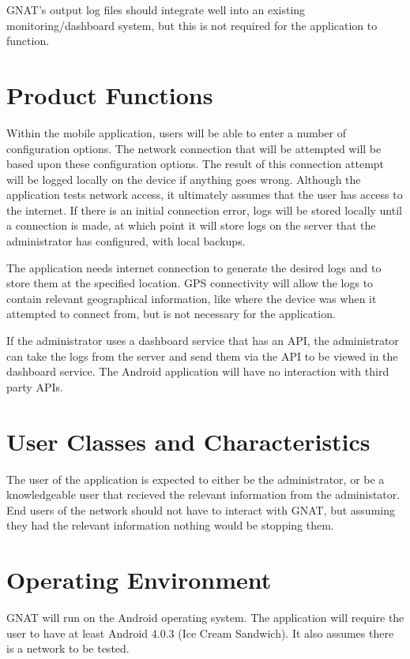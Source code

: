 \documentclass{scrreprt}
\begin{document}
GNAT's output log files should integrate well into an existing monitoring/dashboard system, but this is not required for the application to function.


\section{Product Functions}

Within the mobile application, users will be able to enter a number of configuration options.  The network connection that will be attempted will be based upon these configuration options.  The result of this connection attempt will be logged locally on the device if anything goes wrong. Although the application tests network access, it ultimately assumes that the user has access to the internet.  If there is an initial connection error, logs will be stored locally until a connection is made, at which point it will store logs on the server that the administrator has configured, with local backups.

The application needs internet connection to generate the desired logs and to store them at the specified location. GPS connectivity will allow the logs to contain relevant geographical information, like where the device was when it attempted to connect from, but is not necessary for the application.

If the administrator uses a dashboard service that has an API, the administrator can take the logs from the server and send them via the API to be viewed in the dashboard service. The Android application will have no interaction with third party APIs.

\section{User Classes and Characteristics}
The user of the application is expected to either be the administrator, or be a knowledgeable user that recieved the relevant information from the administator.  End users of the network should not have to interact with GNAT, but assuming they had the relevant information nothing would be stopping them.

\section{Operating Environment}
GNAT will run on the Android operating system.  The application will require the user to have at least Android 4.0.3 (Ice Cream Sandwich). It also assumes there is a network to be tested.
\end{document}
